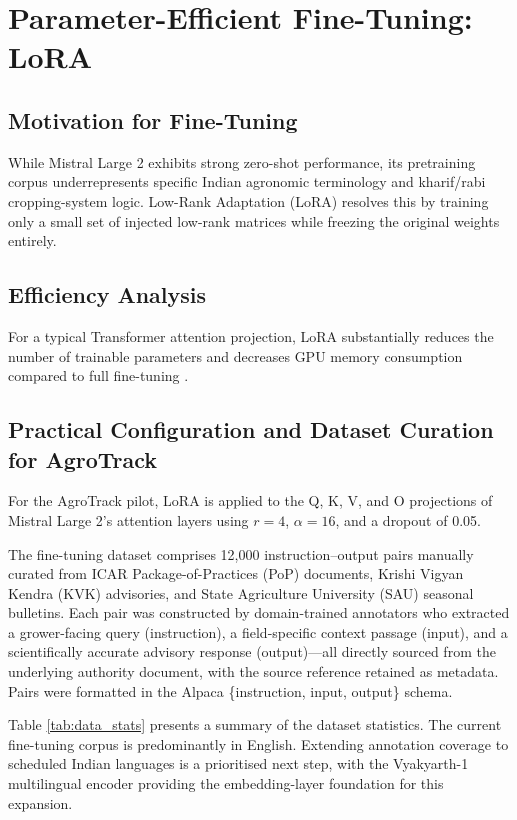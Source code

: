 \documentclass[10pt,twocolumn,letterpaper]{article}
\begin{document}
\section{Parameter-Efficient Fine-Tuning: LoRA}
\subsection{Motivation for Fine-Tuning}
While Mistral Large 2 exhibits strong zero-shot performance, its pretraining corpus underrepresents specific Indian agronomic terminology and kharif/rabi cropping-system logic. Low-Rank Adaptation (LoRA) \cite{Hu_2022} resolves this by training only a small set of injected low-rank matrices while freezing the original weights entirely.

\subsection{Efficiency Analysis}
For a typical Transformer attention projection, LoRA substantially reduces the number of trainable parameters and decreases GPU memory consumption compared to full fine-tuning \cite{Hu_2022}.

\subsection{Practical Configuration and Dataset Curation for AgroTrack}
For the AgroTrack pilot, LoRA is applied to the Q, K, V, and O projections of Mistral Large 2's attention layers using $r=4$, $\alpha=16$, and a dropout of 0.05.

The fine-tuning dataset comprises 12,000 instruction--output pairs manually curated from ICAR Package-of-Practices (PoP) documents, Krishi Vigyan Kendra (KVK) advisories, and State Agriculture University (SAU) seasonal bulletins. Each pair was constructed by domain-trained annotators who extracted a grower-facing query (instruction), a field-specific context passage (input), and a scientifically accurate advisory response (output)---all directly sourced from the underlying authority document, with the source reference retained as metadata. Pairs were formatted in the Alpaca \{instruction, input, output\} schema.

Table \ref{tab:data_stats} presents a summary of the dataset statistics. The current fine-tuning corpus is predominantly in English. Extending annotation coverage to scheduled Indian languages is a prioritised next step, with the Vyakyarth-1 multilingual encoder providing the embedding-layer foundation for this expansion.
\end{document}
